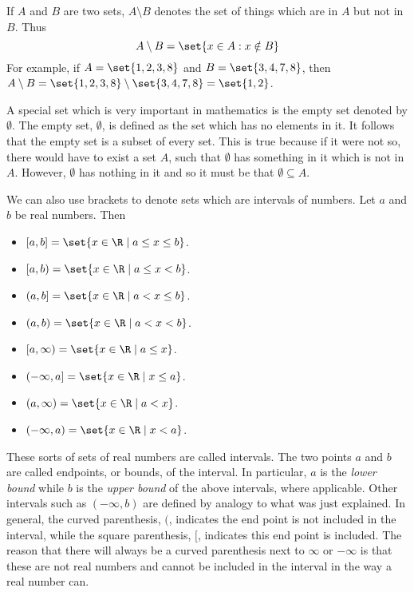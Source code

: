 If $A$ and $B$ are two sets, $A\setminus B$\index{$\setminus$} denotes the set of things which
are in $A$ but not in $B$. Thus
\begin{equation*}
A\setminus B =  \set{x\in A:x\notin B} 
\end{equation*}
For example, if $A = \set{1,2,3,8 }$ and $B = \set{3,4,7,8 }$, then $A \setminus B = \set{1,2,3,8} \setminus 
\set{3,4,7,8 } =\set{1,2 }$.

A special set which is very important in mathematics is the empty set denoted by $\emptyset$. The empty set, $\emptyset$, is
defined as the set which has no elements in it. It follows that the empty set is a subset of every set. 
This is true because if it were not so, there would have to exist a set $A$, such that $\emptyset $
has something in it which is not in $A$. However, $\emptyset $ has nothing
in it and so it must be that $\emptyset \subseteq A$.

We can also use brackets to denote sets which are intervals of numbers. Let $a$ and $b$ be real numbers. Then

\begin{itemize}
\item $[a,b] = \set{x \in \R \mid a\leq x\leq b}$.
\item $[a,b) = \set{x \in \R \mid a\leq x<b}$.
\item $(a,b] = \set{x \in \R \mid a<x\leq b}$.
\item $(a,b) = \set{x \in \R \mid a<x<b}$.
\item $[a,\infty) = \set{x \in \R \mid a\leq x}$.
\item $(-\infty,a] = \set{x \in \R \mid x\leq a}$.
\item $(a,\infty) = \set{x \in \R \mid a<x}$.
\item $(-\infty,a) = \set{x \in \R \mid x<a}$.
\end{itemize}

These sorts of sets of real
numbers are called intervals. The two points $a$ and $b$ are called
endpoints, or bounds, of the interval. In particular, $a$ is the {\em lower bound }  while $b$ is the {\em upper bound } of the above
intervals, where applicable. Other intervals such as $(-\infty ,b) $
are defined by analogy to what was just explained.
 In general, the curved
parenthesis, $($, indicates the end point is not included in the interval, while
the square parenthesis, $[$, indicates this end point is included. The reason that
there will always be a curved parenthesis next to $\infty $ or $-\infty $ is
that these are not real numbers and cannot be included in the interval in the way a real number can. 

